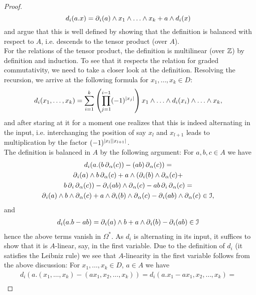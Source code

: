 \begin{prop}
\begin{proof}
\[
  d_i (a.x) = \del_i(a) \wedge %
  x_1 \wedge \ldots \wedge x_k + a \wedge d_i(x)
\]
and argue that this is well defined by showing that the definition is balanced with respect to $A$, i.e. descends to the tensor product (over $A$).\\
For the relations of the tensor product, the definition is multilinear (over $\mathbb{Z}$) by definition and induction. To see that it respects the relation for graded commutativity, we need to take a closer look at the definition. Resolving the recursion, we arrive at the following formula for $x_1, \ldots, x_k \in D$:
\begin{equation*}
  d_i (x_1, \ldots , x_k) = %
  \sum_{i=1}^k %
  \left( \prod_{j=1}^{i-1} (-1)^{\abs{x_j}} \right) %
  x_1 \wedge \ldots \wedge d_i (x_i) %
  \wedge \ldots \wedge x_k,
\end{equation*}
and after staring at it for a moment one realizes that this is indeed alternating in the input, i.e. interchanging the position of say $x_l$ and $x_{l+1}$ leads to multiplication by the factor $(-1)^{\left\vert x_l\right\vert\left\vert x_{l+1}\right\vert}$.\\
The definition is balanced in $A$ by the following argument: For $a,b,c \in A$ we have
\begin{gather*}
  d_i ( a . (b \del_\alpha (c)) - %
    (ab) \del_\alpha (c) ) = \\ %
  \del_i(a) \wedge b \del_\alpha(c) + %
    a \wedge ( \del_i(b) \wedge \del_\alpha (c) + \\ %
      b \del_i \del_\alpha (c) ) - %
    \del_i(ab) \wedge \del_\alpha (c) - %
    ab \del_i \del_\alpha (c) = \\%
  \del_i (a) \wedge b \wedge \del_\alpha (c) + %
    a \wedge \del_i (b) \wedge \del_\alpha (c) - %
    \del_i (ab) \wedge \del_\alpha (c) \in \cI,%
\end{gather*}
and
\begin{gather*}
  d_i(a.b - ab) = \operatorname{\partial}_i (a) \wedge b + a \wedge \operatorname{\partial}_i (b) - \operatorname{\partial}_i (ab) \in \mathcal{I}
\end{gather*}
hence the above terms vanish in $\Omega^*$. As $d_i$ is alternating in its input, it suffices to show that it is $A$-linear, say, in the first variable. Due to the definition of $d_i$ (it satisfies the Leibniz rule) we see that $A$-linearity in the first variable follows from the above discussion: For $x_1 , \ldots , x_k \in D$, $a \in A$ we have
\begin{gather*}
  d_i (a. (x_1, \ldots, x_k) - (a x_1, x_2, \ldots, x_k)) = %
  d_i (a.x_1 - a x_1, x_2, \ldots , x_k) = \\ %

\end{gather*}
\end{proof}
\end{prop}
